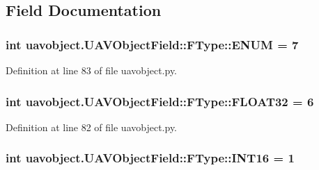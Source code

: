 \subsection{\-Field \-Documentation}
\hypertarget{classuavobject_1_1_u_a_v_object_field_1_1_f_type_a1a2f10017b2d1012290b02ed02f6cef7}{
\subsubsection[{\-E\-N\-U\-M}]{\setlength{\rightskip}{0pt plus 5cm}int {\bf uavobject.\-U\-A\-V\-Object\-Field\-::\-F\-Type\-::\-E\-N\-U\-M} = 7}}\label{classuavobject_1_1_u_a_v_object_field_1_1_f_type_a1a2f10017b2d1012290b02ed02f6cef7}


\-Definition at line 83 of file uavobject.\-py.

\hypertarget{classuavobject_1_1_u_a_v_object_field_1_1_f_type_a88bb9b6066331e0e8154b975f2b1fb82}{
\subsubsection[{\-F\-L\-O\-A\-T32}]{\setlength{\rightskip}{0pt plus 5cm}int {\bf uavobject.\-U\-A\-V\-Object\-Field\-::\-F\-Type\-::\-F\-L\-O\-A\-T32} = 6}}\label{classuavobject_1_1_u_a_v_object_field_1_1_f_type_a88bb9b6066331e0e8154b975f2b1fb82}


\-Definition at line 82 of file uavobject.\-py.

\hypertarget{classuavobject_1_1_u_a_v_object_field_1_1_f_type_a31e8284a6738fd76967ca831494a0aca}{
\subsubsection[{\-I\-N\-T16}]{\setlength{\rightskip}{0pt plus 5cm}int {\bf uavobject.\-U\-A\-V\-Object\-Field\-::\-F\-Type\-::\-I\-N\-T16} = 1}}\label{classuavobject_1_1_u_a_v_object_field_1_1_f_type_a31e8284a6738fd76967ca831494a0aca}


